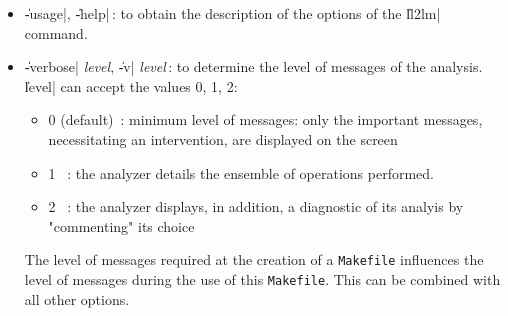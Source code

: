 \begin{itemize}
\item {\Large \|-usage|, \|-help|}\,: to obtain
the description of the options of the \|ll2lm| command.

\item {\Large \|-verbose| {\em level}, \|-v| {\em level}}\,: to determine the level of messages of the analysis.
\|level| can accept the values 0, 1, 2:
\begin{itemize}
\item 0 (default)\ :
minimum level of messages:  only the important messages, necessitating an intervention, are displayed on the screen
\item 1 \ :
the analyzer details the ensemble of operations performed.
\item 2 \ :
the analyzer displays, in addition, a diagnostic of its analyis by "commenting" its choice
\end{itemize}
The level of messages required at the creation of a {\tt Makefile} influences the level of messages during the use of this {\tt Makefile}.  This can be combined with all other options.

\end{itemize}

